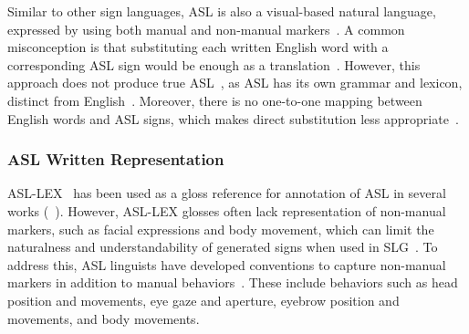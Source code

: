 Similar to other sign languages, ASL is also a visual-based natural language, expressed by using both manual and non-manual markers~\cite{Stokoe1961SignLS}.  A common misconception is that substituting each written English word with a corresponding ASL sign would be enough as a translation~\cite{aslgrammar}. However, this approach does not produce true ASL~\cite{hanson2012computers}, as ASL has its own grammar and lexicon, distinct from English~\cite{lucas2001sociolinguistics,valli2000linguistics}. Moreover, there is no one-to-one mapping between English words and ASL signs, which makes direct substitution less appropriate~\cite{neidle2007signstream}. 


\subsubsection{ASL Written Representation}
ASL-LEX~\cite{caselli2017asl} has been used as a gloss reference for annotation of ASL in several works (\eg~\cite{desai2024asl,joze2018ms,ma2018signfi,bragg2021asl}). However, ASL-LEX glosses often lack representation of non-manual markers, such as facial expressions and body movement, which can limit the naturalness and understandability of generated signs when used in SLG~\cite{huenerfauth_evaluation_2008}. To address this, ASL linguists have developed conventions to capture non-manual markers in addition to manual behaviors~\cite{neidle2001signstream,neidle2007signstream,neidle2002signstream}. These include behaviors such as head position and movements, eye gaze and aperture, eyebrow position and movements, and body movements. 

